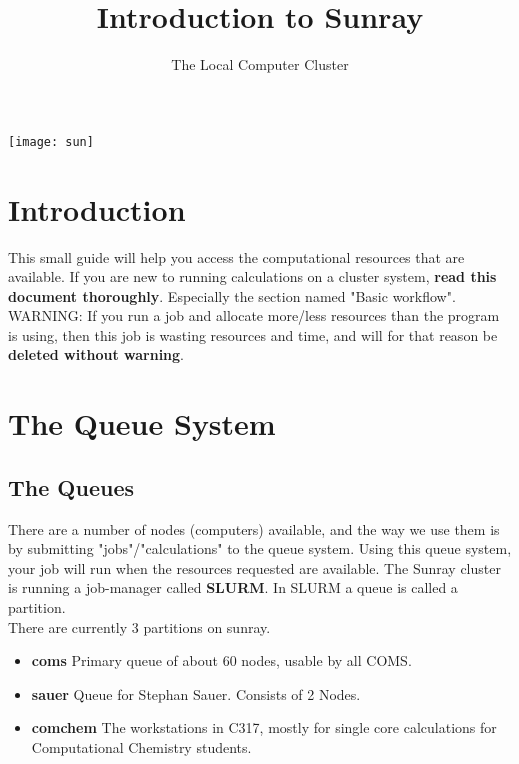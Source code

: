 \documentclass{article}
\title{Introduction to Sunray}
\author{The Local Computer Cluster}
\date{}
\begin{document}

\maketitle

\begin{center}
    \texttt{[image: sun]}
\end{center}

\tableofcontents


\newpage


\section{Introduction}

This small guide will help you access the computational resources that are available.
If you are new to running calculations on a cluster system, {\bf read this document thoroughly}.
Especially the section named "Basic workflow".\\

WARNING: If you run a job and allocate more/less resources than the program is using, then this job is wasting resources and time, and will for that reason be {\bf deleted without warning}.


\newpage
\section{The Queue System}

\subsection*{The Queues}

There are a number of nodes (computers) available, and the way we use them is by submitting "jobs"/"calculations" to the queue system.
%
Using this queue system, your job will run when the resources requested are available.
The Sunray cluster is running a job-manager called {\bf SLURM}.
In SLURM a queue is called a partition.\\

There are currently 3 partitions on sunray.

\begin{itemize}
    \item {\bf coms} Primary queue of about 60 nodes, usable by all COMS. \newline

    \item {\bf sauer} Queue for Stephan Sauer. Consists of 2 Nodes. \newline

    \item {\bf comchem} The workstations in C317, mostly for single core calculations for Computational Chemistry students.

\end{itemize}
\end{document}
